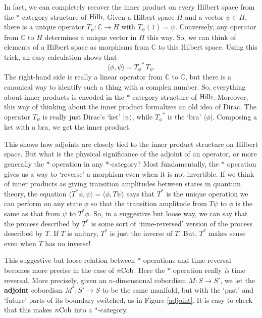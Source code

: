 \documentclass{article}
\newcommand{\Hilb}{{\rm Hilb}}
\newcommand{\Cob}{{\rm Cob}}
\newcommand{\C}{{\mathbb C}}
\renewcommand{\to}{\rightarrow}
\newcommand{\maps}{\colon}
\begin{document}
In fact, we can completely recover the inner product on every
Hilbert space from the $\ast$-category structure of $\Hilb$.  
Given a Hilbert space $H$ and a vector $\psi \in H$,
there is a unique operator $T_\psi \maps \C \to H$ with $T_\psi(1) 
= \psi$.  Conversely, any operator from $\C$ to $H$ determines a
unique vector in $H$ this way.  So, we can think of elements of a 
Hilbert space as morphisms from $\C$ to this Hilbert space.  Using 
this trick, an easy calculation shows that
\[        \langle \phi,\psi \rangle = {T_\phi}^{\!\!\ast}\, T_\psi . \]
The right-hand side is really a linear operator from $\C$ to
$\C$, but there is a canonical way to identify such a thing with a
complex number.  So, everything about inner products is encoded in
the $\ast$-category structure of $\Hilb$.  Moreover, this way of
thinking about the inner product formalizes an old idea of Dirac.
The operator $T_\psi$ is really just Dirac's `ket' $|\psi\rangle$,
while ${T_\phi}^{\!\!\ast}$ is the `bra' $\langle \phi |$.  Composing
a ket with a bra, we get the inner product.

This shows how adjoints are closely tied to the inner product
structure on Hilbert space.  But what is the physical significance 
of the adjoint of an operator, or more generally the $\ast$ operation 
in any $\ast$-category?   Most fundamentally, the $\ast$ operation
gives us a way to `reverse' a morphism even when it is not 
invertible.  If we think of inner products as giving transition 
amplitudes between states in quantum theory, the equation
$ \langle T^\ast \phi,\psi \rangle = \langle \phi, T\psi \rangle $
says that $T^\ast$ is the unique operation we can perform on any state
$\phi$ so that the transition amplitude from $T \psi$ to $\phi$
is the same as that from $\psi$ to $T^\ast \phi$. 
So, in a suggestive but loose way, we can say that the process 
described by $T^\ast$ is some sort of `time-reversed' version of the 
process described by $T$.  If $T$ is unitary, $T^\ast$ is just the 
inverse of $T$.  But, $T^\ast$ makes sense even when $T$ has no inverse!  

This suggestive but loose relation between $\ast$ operations and 
time reversal becomes more precise in the case of $n\Cob$.
Here the $\ast$ operation really {\it is} time reversal.  More
precisely, given an $n$-dimensional cobordism $M \maps S \to S'$,
we let the {\bf adjoint} cobordism $M^\ast \maps S' \to S$ to be 
the same manifold, but with the `past' and `future' parts of its
boundary switched, as in Figure \ref{adjoint}.  It is easy to check
that this makes $n\Cob$ into a $\ast$-category.
\end{document}
